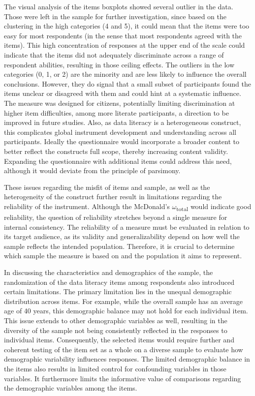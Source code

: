 \documentclass[
  12pt,
  a4paper,
  twoside]{article}
\begin{document}
The visual analysis of the items boxplots showed several outlier in the data. Those were left in the sample for further investigation, since based on the clustering in the high categories (4 and 5), it could mean that the items were too easy for most respondents (in the sense that most respondents agreed with the items). This high concentration of responses at the upper end of the scale could indicate that the items did not adequately discriminate across a range of respondent abilities, resulting in those ceiling effects. The outliers in the low categories (0, 1, or 2) are the minority and are less likely to influence the overall conclusions. However, they do signal that a small subset of participants found the items unclear or disagreed with them and could hint at a systematic influence.
The measure was designed for citizens, potentially limiting discrimination at higher item difficulties, among more literate participants, a direction to be improved in future studies.
Also, as data literacy is a heterogeneous construct, this complicates global instrument development and understanding across all participants. Ideally the questionnaire would incorporate a broader content to better reflect the constructs full scope, thereby increasing content validity. Expanding the questionnaire with additional items could address this need, although it would deviate from the principle of parsimony.

These issues regarding the misfit of items and sample, as well as the heterogeneity of the construct further result in limitations regarding the reliability of the instrument. Although the McDonald's \(\omega\)\textsubscript{total} would indicate good reliability, the question of reliability stretches beyond a single measure for internal consistency.
The reliability of a measure must be evaluated in relation to its target audience, as its validity and generalizability depend on how well the sample reflects the intended population.
Therefore, it is crucial to determine which sample the measure is based on and the population it aims to represent.

In discussing the characteristics and demographics of the sample, the randomization of the data literacy items among respondents also introduced certain limitations.
The primary limitation lies in the unequal demographic distribution across items.
For example, while the overall sample has an average age of 40 years, this demographic balance may not hold for each individual item.
This issue extends to other demographic variables as well, resulting in the diversity of the sample not being consistently reflected in the responses to individual items.
Consequently, the selected items would require further and coherent testing of the item set as a whole on a diverse sample to evaluate how demographic variability influences responses.
The limited demographic balance in the items also results in limited control for confounding variables in those variables. It furthermore limits the informative value of comparisons regarding the demographic variables among the items.
\end{document}
